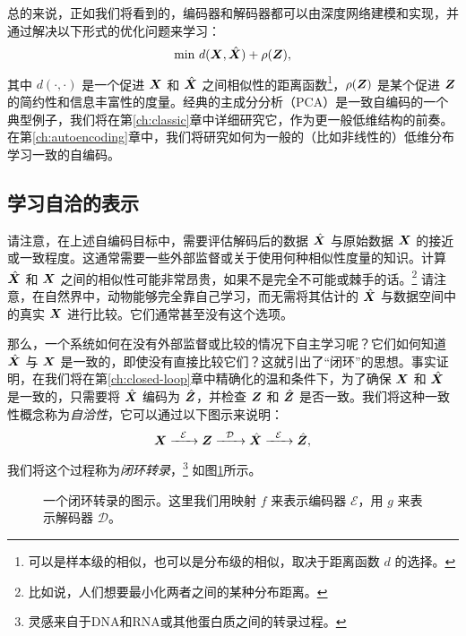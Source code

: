 \documentclass[../../book-main.tex]{subfiles}
\begin{document}
总的来说，正如我们将看到的，编码器和解码器都可以由深度网络建模和实现，并通过解决以下形式的优化问题来学习：
\begin{equation}
   \min \, d( \bm{X}, \hat {\bm{X}}) + \rho(\bm{Z}), 
   \label{eqn:auto-encoding-objective}
\end{equation}
其中 $d(\cdot, \cdot)$ 是一个促进 $\bm{X}$ 和 $\hat {\bm{X}}$ 之间相似性的距离函数\footnote{可以是样本级的相似，也可以是分布级的相似，取决于距离函数 $d$ 的选择。}，$\rho(\bm{Z})$ 是某个促进 $\bm{Z}$ 的简约性和信息丰富性的度量。经典的主成分分析（PCA）\cite{JolliffeI2002}是一致自编码的一个典型例子，我们将在第\ref{ch:classic}章中详细研究它，作为更一般低维结构的前奏。在第\ref{ch:autoencoding}章中，我们将研究如何为一般的（比如非线性的）低维分布学习一致的自编码。


\subsection{学习自洽的表示}
请注意，在上述自编码目标中，需要评估解码后的数据 $\hat {\bm{X}}$ 与原始数据 $\bm{X}$ 的接近或一致程度。这通常需要一些外部监督或关于使用何种相似性度量的知识。计算 $\hat {\bm{X}}$ 和 $\bm{X}$ 之间的相似性可能非常昂贵，如果不是完全不可能或棘手的话。\footnote{比如说，人们想要最小化两者之间的某种分布距离。} 请注意，在自然界中，动物能够完全靠自己学习，而无需将其估计的 $\hat {\bm{X}}$ 与数据空间中的真实 $\bm{X}$ 进行比较。它们通常甚至没有这个选项。

那么，一个系统如何在没有外部监督或比较的情况下自主学习呢？它们如何知道 $\hat {\bm{X}}$ 与 $\bm{X}$ 是一致的，即使没有直接比较它们？这就引出了“闭环”的思想。事实证明，在我们将在第\ref{ch:closed-loop}章中精确化的温和条件下，为了确保 $\bm{X}$ 和 $\hat {\bm{X}}$ 是一致的，只需要将 $\hat {\bm{X}}$ 编码为 $\hat {\bm{Z}}$，并检查 $\bm{Z}$ 和 $\hat {\bm{Z}}$ 是否一致。我们将这种一致性概念称为{\em 自洽性}，它可以通过以下图示来说明：
\begin{equation}
    \bm{X}   \xrightarrow{\hspace{2mm} \mathcal{E}\hspace{2mm}} \bm{Z}  \xrightarrow{\hspace{2mm} \mathcal{D} \hspace{2mm}} \hat {\bm{X}} \xrightarrow{\hspace{2mm} \mathcal{E}\hspace{2mm}} \hat {\bm{Z}},
    \label{eqn:closed-loop}
\end{equation}
我们将这个过程称为{\em 闭环转录}，\footnote{灵感来自于DNA和RNA或其他蛋白质之间的转录过程。} 如图\ref{fig:closed-loop}所示。

\begin{figure}[t]
\caption{一个闭环转录的图示。这里我们用映射 $f$ 来表示编码器 $\mathcal{E}$，用 $g$ 来表示解码器 $\mathcal{D}$。}  \label{fig:closed-loop}
\end{figure}
\end{document}
